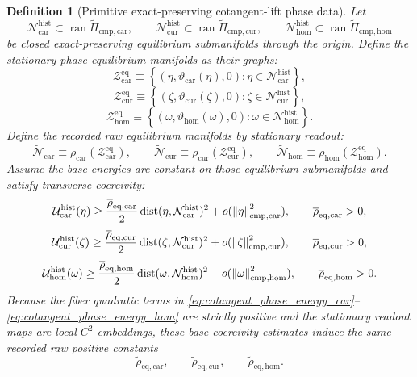 \documentclass[11pt]{article}
\newcommand{\TensorEqCmpProj}{\widetilde\Pi_{\mathrm{cmp,car}}}
\newcommand{\CurEqCmpProj}{\widetilde\Pi_{\mathrm{cmp,cur}}}
\newcommand{\HomEqCmpProj}{\widetilde\Pi_{\mathrm{cmp,hom}}}
\newcommand{\TensorRawEqManifold}{\widetilde{\mathcal N}_{\mathrm{car}}}
\newcommand{\CurRawEqManifold}{\widetilde{\mathcal N}_{\mathrm{cur}}}
\newcommand{\HomRawEqManifold}{\widetilde{\mathcal N}_{\mathrm{hom}}}
\newcommand{\RawCarGap}{\widetilde\rho_{\mathrm{eq,car}}}
\newcommand{\RawCurGap}{\widetilde\rho_{\mathrm{eq,cur}}}
\newcommand{\RawHomGap}{\widetilde\rho_{\mathrm{eq,hom}}}
\newcommand{\TensorPhaseRead}{\rho_{\mathrm{car}}}
\newcommand{\CurPhaseRead}{\rho_{\mathrm{cur}}}
\newcommand{\HomPhaseRead}{\rho_{\mathrm{hom}}}
\newcommand{\TensorPhaseEqManifold}{\mathcal Z_{\mathrm{car}}^{\mathrm{eq}}}
\newcommand{\CurPhaseEqManifold}{\mathcal Z_{\mathrm{cur}}^{\mathrm{eq}}}
\newcommand{\HomPhaseEqManifold}{\mathcal Z_{\mathrm{hom}}^{\mathrm{eq}}}
\newcommand{\PhaseCarGap}{\overline\rho_{\mathrm{eq,car}}}
\newcommand{\PhaseCurGap}{\overline\rho_{\mathrm{eq,cur}}}
\newcommand{\PhaseHomGap}{\overline\rho_{\mathrm{eq,hom}}}
\newtheorem{definition}{Definition}
\begin{document}
\begin{definition}[Primitive exact-preserving cotangent-lift phase data]
Let
\[
\mathcal N_{\mathrm{car}}^{\mathrm{hist}}\subset\operatorname{ran}\TensorEqCmpProj,\qquad
\mathcal N_{\mathrm{cur}}^{\mathrm{hist}}\subset\operatorname{ran}\CurEqCmpProj,\qquad
\mathcal N_{\mathrm{hom}}^{\mathrm{hist}}\subset\operatorname{ran}\HomEqCmpProj
\]
be closed exact-preserving equilibrium submanifolds through the origin. Define the stationary phase equilibrium manifolds as their graphs:
\begin{equation}
\TensorPhaseEqManifold
\equiv
\left\{
(\eta,\vartheta_{\mathrm{car}}(\eta),0):
\eta\in\mathcal N_{\mathrm{car}}^{\mathrm{hist}}
\right\},
\label{eq:cotangent_phase_eq_car}
\end{equation}
\begin{equation}
\CurPhaseEqManifold
\equiv
\left\{
(\zeta,\vartheta_{\mathrm{cur}}(\zeta),0):
\zeta\in\mathcal N_{\mathrm{cur}}^{\mathrm{hist}}
\right\},
\label{eq:cotangent_phase_eq_cur}
\end{equation}
\begin{equation}
\HomPhaseEqManifold
\equiv
\left\{
(\omega,\vartheta_{\mathrm{hom}}(\omega),0):
\omega\in\mathcal N_{\mathrm{hom}}^{\mathrm{hist}}
\right\}.
\label{eq:cotangent_phase_eq_hom}
\end{equation}
Define the recorded raw equilibrium manifolds by stationary readout:
\begin{equation}
\TensorRawEqManifold\equiv\TensorPhaseRead(\TensorPhaseEqManifold),\qquad
\CurRawEqManifold\equiv\CurPhaseRead(\CurPhaseEqManifold),\qquad
\HomRawEqManifold\equiv\HomPhaseRead(\HomPhaseEqManifold).
\label{eq:cotangent_raw_eq_manifold}
\end{equation}
Assume the base energies are constant on those equilibrium submanifolds and satisfy transverse coercivity:
\begin{equation}
\mathcal U_{\mathrm{car}}^{\mathrm{hist}}(\eta)
\ge
\frac{\PhaseCarGap}{2}\operatorname{dist}(\eta,\mathcal N_{\mathrm{car}}^{\mathrm{hist}})^2
+o(\norm{\eta}_{\mathrm{cmp,car}}^2),
\qquad
\PhaseCarGap>0,
\label{eq:cotangent_gap_car}
\end{equation}
\begin{equation}
\mathcal U_{\mathrm{cur}}^{\mathrm{hist}}(\zeta)
\ge
\frac{\PhaseCurGap}{2}\operatorname{dist}(\zeta,\mathcal N_{\mathrm{cur}}^{\mathrm{hist}})^2
+o(\norm{\zeta}_{\mathrm{cmp,cur}}^2),
\qquad
\PhaseCurGap>0,
\label{eq:cotangent_gap_cur}
\end{equation}
\begin{equation}
\mathcal U_{\mathrm{hom}}^{\mathrm{hist}}(\omega)
\ge
\frac{\PhaseHomGap}{2}\operatorname{dist}(\omega,\mathcal N_{\mathrm{hom}}^{\mathrm{hist}})^2
+o(\norm{\omega}_{\mathrm{cmp,hom}}^2),
\qquad
\PhaseHomGap>0.
\label{eq:cotangent_gap_hom}
\end{equation}
Because the fiber quadratic terms in \eqref{eq:cotangent_phase_energy_car}--\eqref{eq:cotangent_phase_energy_hom} are strictly positive and the stationary readout maps are local \(C^2\) embeddings, these base coercivity estimates induce the same recorded raw positive constants
\[
\RawCarGap,\qquad
\RawCurGap,\qquad
\RawHomGap.
\]
\end{definition}
\end{document}
